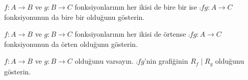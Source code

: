 \begin{prob}
$f \colon A \to B$ ve $g \colon B \to C$ fonksiyonlarının her ikisi de
bire bir ise $\comp{f}{g}\colon A \to C$ fonksiyonunun da bire bir olduğunu
gösterin.
\end{prob}

\begin{prob}
$f \colon A \to B$ ve $g \colon B \to C$ fonksiyonlarının her ikisi de
örtense $\comp{f}{g}\colon A \to C$ fonksiyonunun da örten olduğunu gösterin.
\end{prob}

\begin{prob}
$f \colon A \to B$ ve $g \colon B \to C$ olduğunu varsayın.
$\comp{f}{g}$'nin grafiğinin $R_f \mid R_g$ olduğunu gösterin.
\end{prob}

